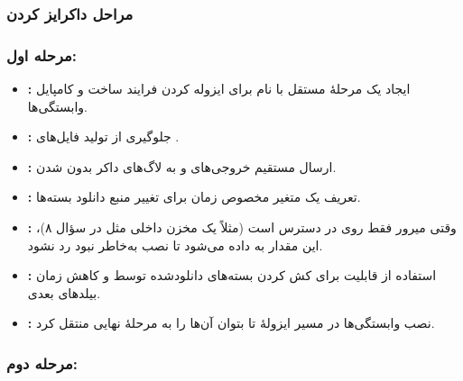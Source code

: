\subsubsection*{مراحل داکرایز کردن}

\subsubsection*{مرحله اول: }

\begin{itemize}
    \item \textbf{:}
    ایجاد یک مرحلهٔ مستقل با نام  برای ایزوله کردن فرایند ساخت و کامپایل وابستگی‌ها.

    \item \textbf{:}
    جلوگیری از تولید فایل‌های .

    \item \textbf{:}
    ارسال مستقیم خروجی‌های  و  به لاگ‌های داکر بدون  شدن.

    \item \textbf{:}
    تعریف یک متغیر مخصوص زمان  برای تغییر منبع دانلود بسته‌ها.

    \item \textbf{:}
    وقتی میرور فقط روی  در دسترس است (مثلاً یک مخزن داخلی مثل  در سؤال ۸)، این مقدار به  داده می‌شود تا نصب به‌خاطر نبود  رد نشود.

    \item \textbf{:}
    استفاده از قابلیت  برای کش کردن بسته‌های دانلودشده توسط  و کاهش زمان بیلدهای بعدی.

    \item \textbf{:}
    نصب وابستگی‌ها در مسیر ایزولهٔ  تا بتوان آن‌ها را به مرحلهٔ نهایی منتقل کرد.
\end{itemize}

\subsubsection*{مرحله دوم: }

